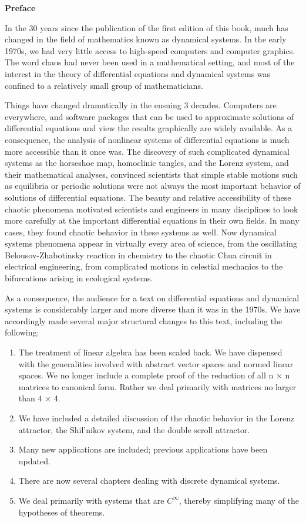 \documentclass[12pt]{article}
\begin{document}
\textbf{Preface}

\hfill

In the 30 years since the publication of the first edition of this book, much
has changed in the field of mathematics known as dynamical systems. In the
early 1970s, we had very little access to high-speed computers and computer
graphics. The word chaos had never been used in a mathematical setting, and
most of the interest in the theory of differential equations and dynamical
systems was confined to a relatively small group of mathematicians.

Things have changed dramatically in the ensuing 3 decades. Computers are
everywhere, and software packages that can be used to approximate solutions
of differential equations and view the results graphically are widely available.
As a consequence, the analysis of nonlinear systems of differential equations
is much more accessible than it once was. The discovery of such complicated
dynamical systems as the horseshoe map, homoclinic tangles, and the
Lorenz system, and their mathematical analyses, convinced scientists that simple
stable motions such as equilibria or periodic solutions were not always the
most important behavior of solutions of differential equations. The beauty
and relative accessibility of these chaotic phenomena motivated scientists and
engineers in many disciplines to look more carefully at the important differential
equations in their own fields. In many cases, they found chaotic behavior in
these systems as well. Now dynamical systems phenomena appear in virtually
every area of science, from the oscillating Belousov-Zhabotinsky reaction in
chemistry to the chaotic Chua circuit in electrical engineering, from complicated
motions in celestial mechanics to the bifurcations arising in ecological
systems.

As a consequence, the audience for a text on differential equations and
dynamical systems is considerably larger and more diverse than it was in
the 1970s. We have accordingly made several major structural changes to
this text, including the following:

\begin{enumerate}
\item The treatment of linear algebra has been scaled back. We have dispensed
with the generalities involved with abstract vector spaces and normed
linear spaces. We no longer include a complete proof of the reduction
of all n × n matrices to canonical form. Rather we deal primarily with
matrices no larger than 4 × 4.
\item We have included a detailed discussion of the chaotic behavior in the
Lorenz attractor, the Shil’nikov system, and the double scroll attractor.
\item Many new applications are included; previous applications have been
updated.
\item There are now several chapters dealing with discrete dynamical systems.
\item We deal primarily with systems that are $C^{\infty}$, thereby simplifying many of
the hypotheses of theorems.
\end{enumerate}
\end{document}
